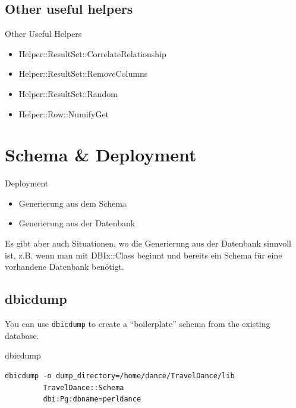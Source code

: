 \subsection{Other useful helpers}
\begin{frame}{Other Useful Helpers}
\begin{itemize}
\item Helper::ResultSet::CorrelateRelationship
\item Helper::ResultSet::RemoveColumns
\item Helper::ResultSet::Random
\item Helper::Row::NumifyGet
\end{itemize}
\end{frame}


\section{Schema \& Deployment}

\begin{frame}{Deployment}
\begin{itemize}
\item Generierung aus dem Schema
\item Generierung aus der Datenbank
\end{itemize}
\end{frame}

Es gibt aber auch Situationen, wo die
Generierung aus der Datenbank sinnvoll ist,
z.B. wenn man mit DBIx::Class beginnt und
bereits ein Schema für eine vorhandene
Datenbank benötigt.


\subsection{dbicdump}

You can use \verb|dbicdump| to create a ``boilerplate'' schema from the
existing database.

\begin{frame}[fragile]{dbicdump}
\begin{lstlisting}
dbicdump -o dump_directory=/home/dance/TravelDance/lib 
         TravelDance::Schema 
         dbi:Pg:dbname=perldance
\end{lstlisting}
\end{frame}

